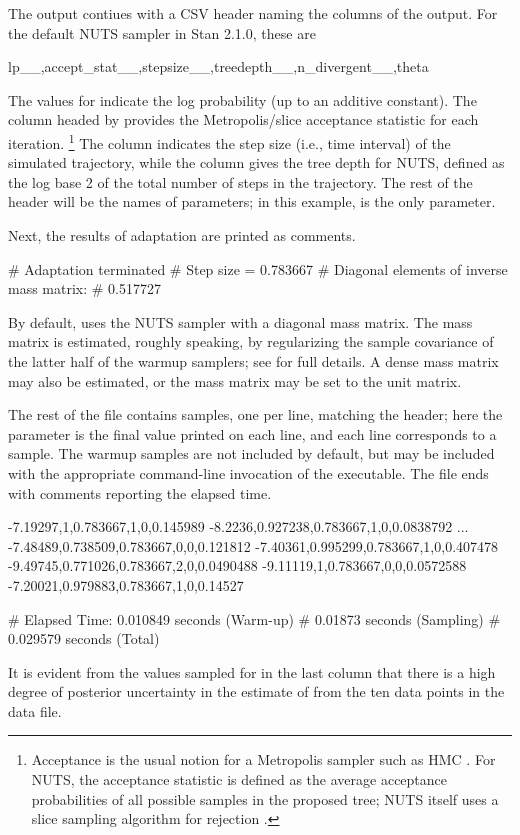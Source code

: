 \documentclass[article]{jss}
\begin{document}
The output contiues with a CSV header naming the columns of the
output. For the default NUTS sampler in Stan 2.1.0, these are
%
\begin{Code}
lp__,accept_stat__,stepsize__,treedepth__,n_divergent__,theta
\end{Code}
%
The values for  indicate the log probability (up to an
additive constant).  The column headed by 
provides the Metropolis/slice acceptance statistic for each
iteration.%
%
\footnote{Acceptance is the usual notion for a Metropolis sampler such
  as HMC \citep{MetropolisEtAl:1953}.  For NUTS, the acceptance
  statistic is defined as the average acceptance probabilities of all
  possible samples in the proposed tree; NUTS itself uses a slice
  sampling algorithm for rejection \citep{Neal:2003}.}
%
The column  indicates the step size
(i.e., time interval) of the simulated trajectory, while the column 
 gives the tree depth for NUTS, defined as the 
log base 2 of the total number of steps in the trajectory.
The rest of the header will be the names of parameters; in this
example,  is the only parameter.

Next, the results of adaptation are printed as comments.
%
\begin{Code}
# Adaptation terminated
# Step size = 0.783667
# Diagonal elements of inverse mass matrix:
# 0.517727
\end{Code}
%
By default,  uses the NUTS sampler with a diagonal mass
matrix.  The mass matrix is estimated, roughly speaking, by
regularizing the sample covariance of the latter half of the warmup
samplers; see \citep{Stan:2013} for full details.  A dense mass matrix
may also be estimated, or the mass matrix may be set to the unit matrix.

The rest of the file contains samples, one per line, matching the
header; here the parameter  is the final value printed on
each line, and each line corresponds to a sample.  The warmup samples
are not included by default, but may be included with the appropriate
command-line invocation of the executable. The file ends with comments reporting the elapsed time.
%
\begin{Code}
-7.19297,1,0.783667,1,0,0.145989
-8.2236,0.927238,0.783667,1,0,0.0838792
...
-7.48489,0.738509,0.783667,0,0,0.121812
-7.40361,0.995299,0.783667,1,0,0.407478
-9.49745,0.771026,0.783667,2,0,0.0490488
-9.11119,1,0.783667,0,0,0.0572588
-7.20021,0.979883,0.783667,1,0,0.14527

#  Elapsed Time: 0.010849 seconds (Warm-up)
#                0.01873 seconds (Sampling)
#                0.029579 seconds (Total)
\end{Code}
%
It is evident from the values sampled for  in the last
column that there is a high degree of posterior uncertainty in the
estimate of  from the ten data points in the data file.
\end{document}
